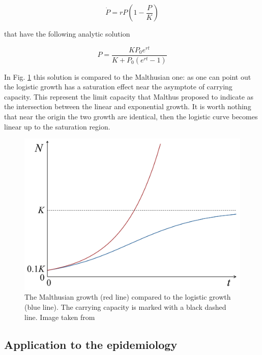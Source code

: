 \documentclass[
12pt, %
a4paper, %
oneside, %
headinclude,footinclude, %
BCOR5mm, %
]{scrartcl}
\begin{document}
\begin{equation}
\dot{P}=rP\left(1-\dfrac{P}{K} \right)
\end{equation}

that have the following analytic solution 

\begin{equation}
P=\dfrac{KP_{0}e^{rt}}{K+P_{0}(e^{rt}-1)}
\label{logistic_equation}
\end{equation}

In Fig. \ref{Malthusian_growth_vs_logistic_growth} this solution is compared to the Malthusian one: as one can point out the logistic growth has a saturation effect near the asymptote of carrying capacity. This represent the limit capacity that Malthus proposed to indicate as the intersection between the linear and exponential growth. It is worth nothing that near the origin the two growth are identical, then the logistic curve becomes linear up to the saturation region. 

\begin{figure}
 \centering
 \includegraphics[width=0.8\linewidth]{Figures/Malthusian_growth_vs_logistic_growth-2.jpg} 
 \caption{The Malthusian growth (red line) compared to the logistic growth (blue line). The carrying capacity is marked with a black dashed line. Image taken from \cite{malthus_vs_logistic}}
 \label{Malthusian_growth_vs_logistic_growth}
\end{figure}

\subsection{Application to the epidemiology}
\end{document}
